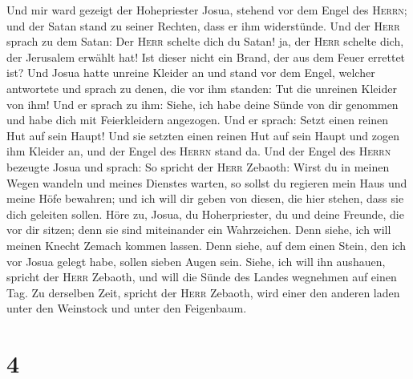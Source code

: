  Und mir ward gezeigt der Hohepriester Josua, stehend vor
dem Engel des \textsc{Herrn}; und der Satan stand zu seiner Rechten,
dass er ihm widerstünde.  Und der \textsc{Herr} sprach zu
dem Satan: Der \textsc{Herr} schelte dich du Satan! ja, der
\textsc{Herr} schelte dich, der Jerusalem erwählt hat! Ist dieser nicht
ein Brand, der aus dem Feuer errettet ist?  Und Josua
hatte unreine Kleider an und stand vor dem Engel,  welcher
antwortete und sprach zu denen, die vor ihm standen: Tut die unreinen
Kleider von ihm! Und er sprach zu ihm: Siehe, ich habe deine Sünde von
dir genommen und habe dich mit Feierkleidern angezogen. 
Und er sprach: Setzt einen reinen Hut auf sein Haupt! Und sie setzten
einen reinen Hut auf sein Haupt und zogen ihm Kleider an, und der Engel
des \textsc{Herrn} stand da.  Und der Engel des
\textsc{Herrn} bezeugte Josua und sprach:  So spricht der
\textsc{Herr} Zebaoth: Wirst du in meinen Wegen wandeln und meines
Dienstes warten, so sollst du regieren mein Haus und meine Höfe
bewahren; und ich will dir geben von diesen, die hier stehen, dass sie
dich geleiten sollen.  Höre zu, Josua, du Hoherpriester,
du und deine Freunde, die vor dir sitzen; denn sie sind miteinander ein
Wahrzeichen. Denn siehe, ich will meinen Knecht Zemach kommen lassen.
 Denn siehe, auf dem einen Stein, den ich vor Josua gelegt
habe, sollen sieben Augen sein. Siehe, ich will ihn aushauen, spricht
der \textsc{Herr} Zebaoth, und will die Sünde des Landes wegnehmen auf
einen Tag.  Zu derselben Zeit, spricht der \textsc{Herr}
Zebaoth, wird einer den anderen laden unter den Weinstock und unter den
Feigenbaum.

\hypertarget{section-3}{%
\section{4}\label{section-3}}

